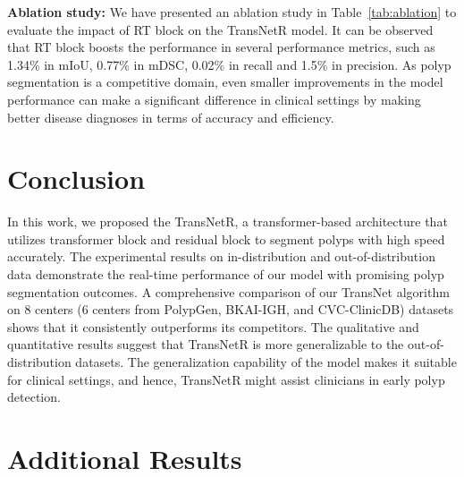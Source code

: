 \documentclass{midl} \usepackage{mwe}
\begin{document}
\par {\textbf{Ablation study:} We have presented an ablation study in Table~\ref{tab:ablation} to evaluate the impact of RT block on the TransNetR model. It can be observed that RT block boosts the performance in several performance metrics, such as 1.34\% in mIoU, 0.77\% in mDSC, 0.02\% in recall and 1.5\% in precision. As polyp segmentation is a competitive domain, even smaller improvements in the model performance can make a significant difference in clinical settings by making better disease diagnoses in terms of accuracy and efficiency.} 


\section{Conclusion}
In this work, we proposed the TransNetR, a transformer-based architecture that utilizes transformer block and residual block to segment polyps with high speed accurately. The experimental results on in-distribution and out-of-distribution data demonstrate the real-time performance of our model with promising polyp segmentation outcomes. A comprehensive comparison of our TransNet algorithm on 8 centers (6 centers from PolypGen, BKAI-IGH, and CVC-ClinicDB) datasets shows that it consistently outperforms its competitors. The qualitative and quantitative results suggest that TransNetR is more generalizable to the out-of-distribution datasets. The generalization capability of the model makes it suitable for clinical settings, and hence, TransNetR might assist clinicians in early polyp detection. 





\newpage
\appendix 
\section{Additional Results}
\end{document}
